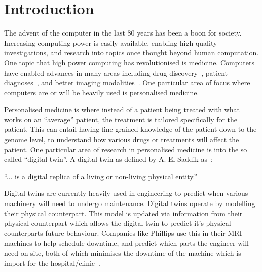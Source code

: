\chapter{Introduction}






The advent of the computer in the last 80 years has been a boon for society.
Increasing computing power is easily available, enabling high-quality investigations, and research into topics once thought beyond human computation.
One topic that high power computing has revolutionised is medicine.
Computers have enabled advances in many areas including drug discovery~\cite{aaqvist1994new,lill2011computer}, patient diagnoses~\cite{liu2014early,sun2016computer}, and better imaging modalities~\cite{brooks1976principles,al2012digital}.
One particular area of focus where computers are or will be heavily used is personalised medicine.

Personalised medicine is where instead of a patient being treated with what works on an ``average'' patient, the treatment is tailored specifically for the patient.
This can entail having fine grained knowledge of the patient down to the genome level, to understand how various drugs or treatments will affect the patient.
One particular area of research in personalised medicine is into the so called ``digital twin''.
A digital twin as defined by A. El Saddik as~\cite{el2018digital}:

\medskip
``... is a digital replica of a living or non-living physical entity.''
\medskip

\noindent Digital twins are currently heavily used in engineering to predict when various machinery will need to undergo maintenance.
Digital twins operate by modelling their physical counterpart.
This model is updated via information from their physical counterpart which allows the digital twin to predict it's physical counterparts future behaviour.
Companies like Phillips use this in their MRI machines to help schedule downtime, and predict which parts the engineer will need on site, both of which minimises the downtime of the machine which is import for the hospital/clinic~\cite{henkvanhouten2018}.

